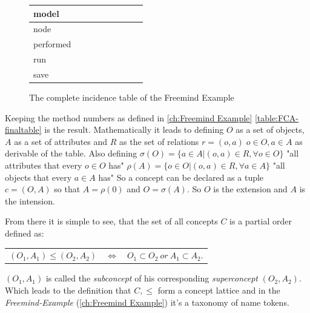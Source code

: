 \begin{figure}
\begin{tabular}{| l | c | c | c | c | c | c | c | c |}
      model 		& \checkmark	& \checkmark & \checkmark  & \checkmark & \checkmark & \checkmark  & \checkmark & \checkmark \\ \hline
      node 		&			    	&                    &                     &                    &                    & \checkmark  & \checkmark &                     \\ \hline
      performed 	&			    	&                    &                     &                    &                    &                     &                    & \checkmark  \\ \hline
      run 			& \checkmark 	&                    &                     &                    &                    &                     &                    &                     \\ \hline
      save 		& \checkmark	& \checkmark & \checkmark  &			     & \checkmark & \checkmark  & \checkmark &				 \\ \hline
    \end{tabular}
     \caption{The complete incidence table of the Freemind Example}
     \label{table:FCA-finaltable}
\end{figure}

Keeping the method numbers as defined in \autoref{ch:Freemind Example}  \autoref{table:FCA-finaltable} is the result. Mathematically it leads to defining $O$ as a set of objects, $A$ as a set of attributes and $R$ as the set of relations $r = (o,a) \; o\in O,a\in A$ as derivable of the table. Also defining \newline
$\sigma(O) = \{a \in A | (o,a) \in R, \forall o \in O \}$  \quad "all attributes that every $o\in O$ has" \newline
 $\rho(A)= \{o\in O|(o,a)\in R, \forall a\in A \}$  \quad "all objects that every $a\in A$ has" \newline
So a concept can be declared as a tuple $c=(O,A)$ so that $A=\rho(0)$ and $O=\sigma(A)$. So $O$ is the extension and $A$ is the intension.

From there it is simple to see, that the set of all concepts $C$ is a partial order defined as: \newline
\begin{center}
  \vspace{-2em}
  \begin{tabular}{ r c l }
  $ (O_1,A_1) \le (O_2, A_2)$ & $\Leftrightarrow$ & $O_1 \subset O_2 \ or \ A_1 \subset A_2$. \\
  \end{tabular}
\end{center}
\vspace{-1em}
$(O_1,A_1)$ is called the \emph{subconcept} of his corresponding \emph{superconcept} $(O_2,A_2)$. \newline
Which leads to the definition that $C, \le$ form a concept lattice and in the \textit{Freemind-Example} (\autoref{ch:Freemind Example}) it's a taxonomy of name tokens.

